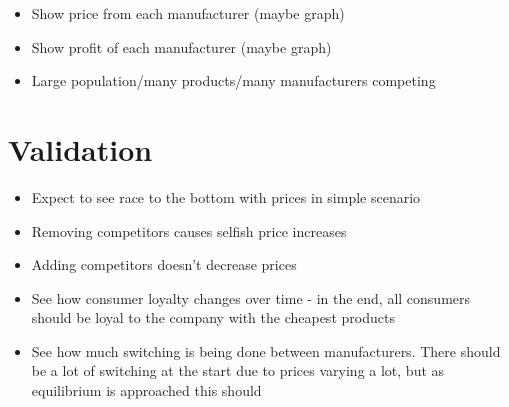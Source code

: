 \documentclass[11pt]{article}
\begin{document}
\begin{itemize}
\item Show price from each manufacturer (maybe graph)
\item Show profit of each manufacturer (maybe graph)
\item Large population/many products/many manufacturers competing
\end{itemize}
\section{Validation}
\label{sec-4}

\begin{itemize}
\item Expect to see race to the bottom with prices in simple scenario
\item Removing competitors causes selfish price increases
\item Adding competitors doesn't decrease prices
\item See how consumer loyalty changes over time - in the end, all consumers should be loyal to the company with the cheapest products
\item See how much switching is being done between manufacturers. There should be a lot of switching at the start due to prices varying a lot, but as equilibrium is approached this should
\end{itemize}
\end{document}

